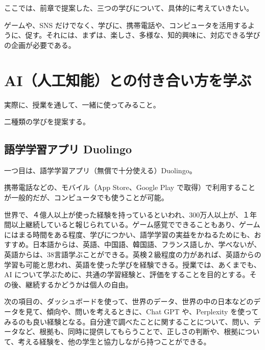 \documentclass[
]{book}
\theoremstyle{definition}
\theoremstyle{definition}
\theoremstyle{definition}
\theoremstyle{definition}
\theoremstyle{remark}
\begin{document}
ここでは、前章で提案した、三つの学びについて、具体的に考えていきたい。

ゲームや、SNS だけでなく、学びに、携帯電話や、コンピュータを活用するように、促す。それには、まずは、楽しさ、多様な、知的興味に、対応できる学びの企画が必要である。

\hypertarget{aiux4ebaux5de5ux77e5ux80fdux3068ux306eux4ed8ux304dux5408ux3044ux65b9ux3092ux5b66ux3076-1}{%
\section{AI（人工知能）との付き合い方を学ぶ}\label{aiux4ebaux5de5ux77e5ux80fdux3068ux306eux4ed8ux304dux5408ux3044ux65b9ux3092ux5b66ux3076-1}}

実際に、授業を通して、一緒に使ってみること。

二種類の学びを提案する。

\hypertarget{ux8a9eux5b66ux5b66ux7fd2ux30a2ux30d7ux30ea-duolingo}{%
\subsection{語学学習アプリ Duolingo}\label{ux8a9eux5b66ux5b66ux7fd2ux30a2ux30d7ux30ea-duolingo}}

一つ目は、語学学習アプリ（無償で十分使える）Duolingo。

携帯電話などの、モバイル（App Store、Google Play で取得）で利用することが一般的だが、コンピュータでも使うことが可能。

世界で、４億人以上が使った経験を持っているといわれ、300万人以上が、１年間以上継続していると報じられている。ゲーム感覚でできることもあり、ゲームにはまる時間をある程度、学びにつかい、語学学習の実益をかねるためにも、おすすめ。日本語からは、英語、中国語、韓国語、フランス語しか、学べないが、英語からは、38言語学ぶことができる。英検２級程度の力があれば、英語からの学習も可能と思われ、英語を使った学びを経験できる。授業では、あくまでも、AI について学ぶために、共通の学習経験と、評価をすることを目的とする。その後、継続するかどうかは個人の自由。

次の項目の、ダッシュボードを使って、世界のデータ、世界の中の日本などのデータを見て、傾向や、問いを考えるときに、Chat GPT や、Perplexity を使ってみるのも良い経験となる。自分達で調べたことに関することについて、問い、データなど、根拠も、同時に提供してもらうことで、正しさの判断や、根拠について、考える経験を、他の学生と協力しながら持つことができる。
\end{document}
